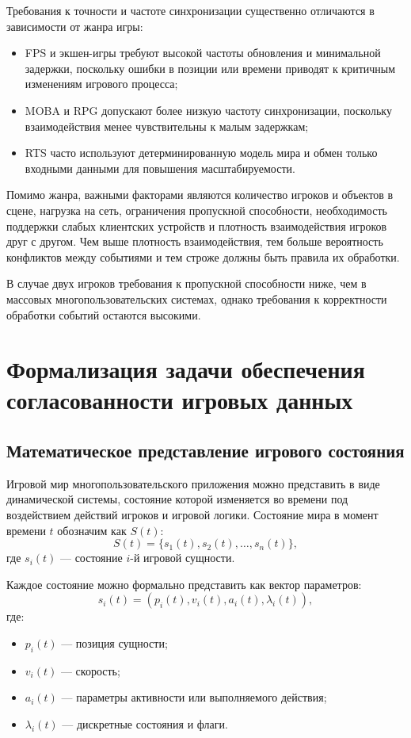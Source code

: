 Требования к точности и частоте синхронизации существенно отличаются в зависимости от жанра игры:
\begin{itemize}
	\item FPS и экшен-игры требуют высокой частоты обновления и минимальной задержки, поскольку ошибки в позиции или времени приводят к критичным изменениям игрового процесса;
	\item MOBA и RPG допускают более низкую частоту синхронизации, поскольку взаимодействия менее чувствительны к малым задержкам;
	\item RTS часто используют детерминированную модель мира и обмен только входными данными для повышения масштабируемости.
\end{itemize}

Помимо жанра, важными факторами являются количество игроков и объектов в сцене, нагрузка на сеть, ограничения пропускной способности, необходимость поддержки слабых клиентских устройств и плотность взаимодействия игроков друг с другом. Чем выше плотность взаимодействия, тем больше вероятность конфликтов между событиями и тем строже должны быть правила их обработки.

В случае двух игроков требования к пропускной способности ниже, чем в массовых многопользовательских системах, однако требования к корректности обработки событий остаются высокими.

\section{Формализация задачи обеспечения согласованности игровых данных}

\subsection{Математическое представление игрового состояния}

Игровой мир многопользовательского приложения можно представить в виде динамической системы, состояние которой изменяется во времени под воздействием действий игроков и игровой логики. Состояние мира в момент времени $t$ обозначим как $S(t)$:
\[
	S(t) = \{ s_1(t), s_2(t), \ldots, s_n(t) \},
\]
где $s_i(t)$ --- состояние $i$-й игровой сущности.

Каждое состояние можно формально представить как вектор параметров:
\[
	s_i(t) = \left( p_i(t), v_i(t), a_i(t), \lambda_i(t) \right),
\]
где:
\begin{itemize}
	\item $p_i(t)$ --- позиция сущности;
	\item $v_i(t)$ --- скорость;
	\item $a_i(t)$ --- параметры активности или выполняемого действия;
	\item $\lambda_i(t)$ --- дискретные состояния и флаги.
\end{itemize}

